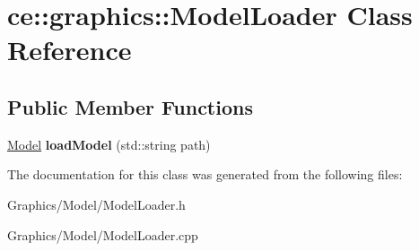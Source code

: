 \hypertarget{classce_1_1graphics_1_1_model_loader}{}\section{ce\+:\+:graphics\+:\+:Model\+Loader Class Reference}
\label{classce_1_1graphics_1_1_model_loader}
\subsection*{Public Member Functions}
\begin{DoxyCompactItemize}
\item 
\mbox{\label{classce_1_1graphics_1_1_model_loader_aee7761094a5e10a81555b4a695a55043}} 
\hyperlink{classce_1_1graphics_1_1_model}{Model} {\bfseries load\+Model} (std\+::string path)
\end{DoxyCompactItemize}


The documentation for this class was generated from the following files\+:\begin{DoxyCompactItemize}
\item 
Graphics/\+Model/Model\+Loader.\+h\item 
Graphics/\+Model/Model\+Loader.\+cpp\end{DoxyCompactItemize}
